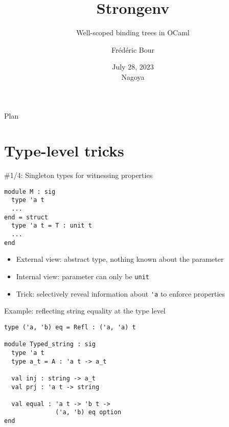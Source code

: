 \documentclass{beamer}          %
\title{Strongenv}  %
\subtitle{Well-scoped binding trees in OCaml}
\author{Frédéric Bour}                %
\institute{Tarides, Inria}          %
\date{July 28, 2023 \\ Nagoya}                  %
\begin{document}
\begin{frame}
  \titlepage
\end{frame}

\begin{frame}{Plan}
  \tableofcontents
\end{frame}


\section{Type-level tricks}


\begin{frame}[fragile]{\#1/4: Singleton types for witnessing properties}

\begin{lstlisting}
module M : sig
  type 'a t
  ...
end = struct
  type 'a t = T : unit t
  ...
end
\end{lstlisting}

  \begin{itemize}
    \item External view: abstract type, nothing known about the parameter
    \item Internal view: parameter can only be \lstinline{unit}
    \item Trick: selectively reveal information about \lstinline{'a} to enforce properties
  \end{itemize}

\end{frame}

\begin{frame}[fragile]{Example: reflecting string equality at the type level}
\begin{lstlisting}
type ('a, 'b) eq = Refl : ('a, 'a) t

module Typed_string : sig
  type 'a t
  type a_t = A : 'a t -> a_t

  val inj : string -> a_t
  val prj : 'a t -> string

  val equal : 'a t -> 'b t ->
              ('a, 'b) eq option
end
\end{lstlisting}
\end{frame}
\end{document}
